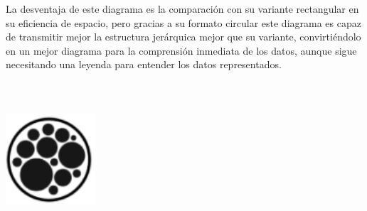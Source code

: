 \documentclass{article}\usepackage[]{graphicx}\usepackage[]{color}
\begin{document}
 La desventaja de este diagrama es la comparaci\'on con su variante rectangular en su eficiencia de espacio, pero gracias a su formato circular este diagrama es capaz de transmitir mejor la estructura jer\'arquica mejor que su variante, convirti\'endolo en un mejor diagrama para la comprensi\'on inmediata de los datos, aunque sigue necesitando una leyenda para entender los datos representados.
~\\~\\~\\~\\
\vbox{
    \centering
    \includegraphics[width=0.25\textwidth]{imag/arbol}
}
\clearpage
\end{document}
